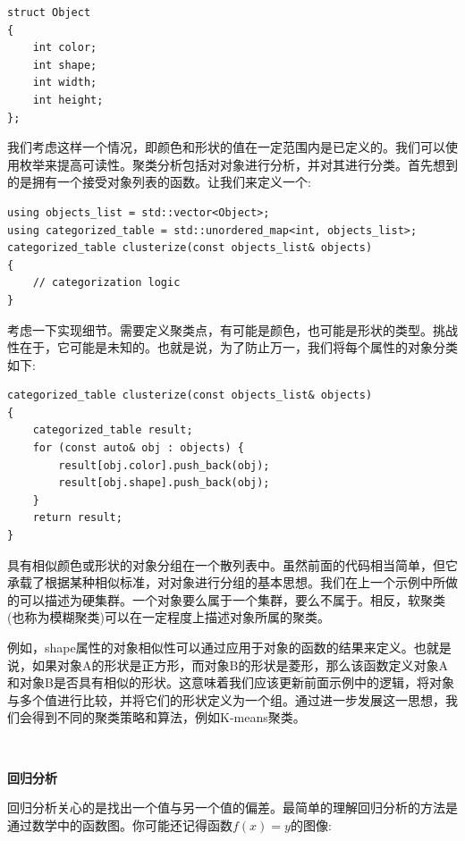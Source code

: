 \begin{lstlisting}[caption={}]
struct Object
{
	int color;
	int shape;
	int width;
	int height;
};
\end{lstlisting}

我们考虑这样一个情况，即颜色和形状的值在一定范围内是已定义的。我们可以使用枚举来提高可读性。聚类分析包括对对象进行分析，并对其进行分类。首先想到的是拥有一个接受对象列表的函数。让我们来定义一个: \par

\begin{lstlisting}[caption={}]
using objects_list = std::vector<Object>;
using categorized_table = std::unordered_map<int, objects_list>;
categorized_table clusterize(const objects_list& objects)
{
	// categorization logic
}
\end{lstlisting}

考虑一下实现细节。需要定义聚类点，有可能是颜色，也可能是形状的类型。挑战性在于，它可能是未知的。也就是说，为了防止万一，我们将每个属性的对象分类如下: \par

\begin{lstlisting}[caption={}]
categorized_table clusterize(const objects_list& objects)
{
	categorized_table result;
	for (const auto& obj : objects) {
		result[obj.color].push_back(obj);
		result[obj.shape].push_back(obj);
	}
	return result;
}
\end{lstlisting}

具有相似颜色或形状的对象分组在一个散列表中。虽然前面的代码相当简单，但它承载了根据某种相似标准，对对象进行分组的基本思想。我们在上一个示例中所做的可以描述为硬集群。一个对象要么属于一个集群，要么不属于。相反，软聚类(也称为模糊聚类)可以在一定程度上描述对象所属的聚类。 \par
例如，shape属性的对象相似性可以通过应用于对象的函数的结果来定义。也就是说，如果对象A的形状是正方形，而对象B的形状是菱形，那么该函数定义对象A和对象B是否具有相似的形状。这意味着我们应该更新前面示例中的逻辑，将对象与多个值进行比较，并将它们的形状定义为一个组。通过进一步发展这一思想，我们会得到不同的聚类策略和算法，例如K-means聚类。 \par

\noindent\textbf{}\ \par
\textbf{回归分析} \ \par
回归分析关心的是找出一个值与另一个值的偏差。最简单的理解回归分析的方法是通过数学中的函数图。你可能还记得函数$ f(x) = y $的图像: \par

